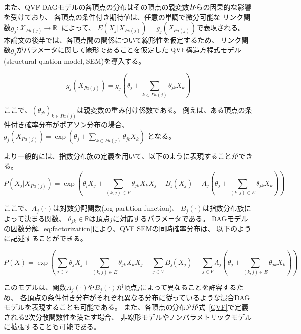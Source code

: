 また、QVF DAGモデルの各頂点の分布はその頂点の親変数からの因果的な影響を受けており、
各頂点の条件付き期待値は、任意の単調で微分可能な
リンク関数$g_j \colon \mathcal X_{Pa(j)} \rightarrow \mathbb R^+$によって、
$E(X_j|X_{Pa(j)}) = g_j(X_{Pa(j)})$で表現される。
本論文の後半では、各頂点間の関係について線形性を仮定するため、
リンク関数$g_j$がパラメータに関して線形であることを仮定した
QVF構造方程式モデル(structural quation model, SEM)を導入する。

\begin{equation}
  g_j(X_{Pa(j)}) = g_j \left(\theta_j + \sum_{k \in Pa(j)} \theta_{jk}X_k \right)
\end{equation}

ここで、$(\theta_{jk})_{k \in Pa(j)}$は親変数の重み付け係数である。
例えば、ある頂点の条件付き確率分布がポアソン分布の場合、
$g_j(X_{Pa(j)}) = \exp(\theta_j + \sum_{k \in Pa(j)} \theta_{jk}X_k)$
となる。

より一般的には、指数分布族の定義を用いて、以下のように表現することができる。
\begin{equation}
  P(X_j|X_{Pa(j)}) = \exp \left( \theta_{j}X_j  + \sum_{(k,j)\in E} \theta_{jk}X_k X_j -
  B_j(X_j) - A_j \left( \theta_{j} + \sum_{(k,j) \in E} \theta_{jk} X_k \right) \right)
\end{equation}

ここで、$A_j(\cdot)$は対数分配関数(log-partition function)、
$B_j(\cdot)$は指数分布族によって決まる関数、
$\theta_{jk}\in \mathbb R$は頂点$j$に対応するパラメータである。
DAGモデルの因数分解~\eqref{eq:factorization}により、QVF SEMの同時確率分布は、
以下のように記述することができる。

\begin{equation}
  P(X) = \exp \left( \sum_{j\in V} \theta_{j}X_j + \sum_{(k,j)\in E} \theta_{jk}X_k X_j
  - \sum_{j \in V} B_j(X_j) - \sum_{j \in V} A_j
  \left( \theta_{j} + \sum_{(k,j)\in E} \theta_{jk} X_k \right)\right)
  \label{eq:QVF_factorization}
\end{equation}

このモデルは、関数$A_j(\cdot)$や$B_j(\cdot)$が頂点$j$によって異なることを許容するため、
各頂点の条件付き分布がそれぞれ異なる分布に従っているような混合DAGモデルを表現することも可能である。
また、各頂点の分布$\mathcal P$が式~\eqref{QVF}で定義される2次分散関数性を満たす場合、
非線形モデルやノンパラメトリックモデルに拡張することも可能である。
